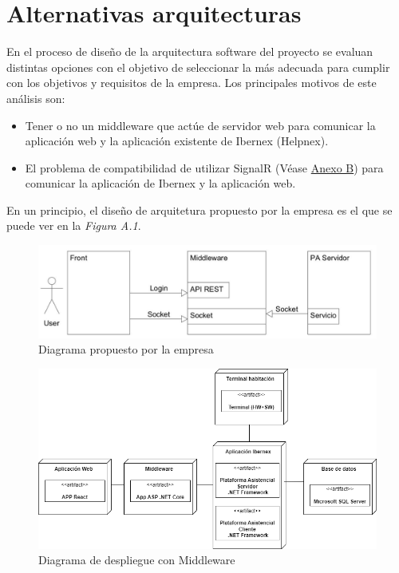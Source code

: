 \chapter{Alternativas arquitecturas}
\label{anexo-a}

En el proceso de diseño de la arquitectura software del proyecto se evaluan distintas opciones con el objetivo de seleccionar la más adecuada para cumplir con los objetivos y requisitos de la empresa. Los principales motivos de este análisis son:

\begin{itemize}
    \item Tener o no un middleware que actúe de servidor web para comunicar la aplicación web y la aplicación existente de Ibernex (Helpnex).
    \item El problema de compatibilidad de utilizar SignalR (Véase  \hyperref[anexo-b]{Anexo B}) para comunicar la aplicación de Ibernex y la aplicación web.
\end{itemize}

En un principio, el diseño de arquitetura propuesto por la empresa es el que se puede ver en la \textit{Figura A.1}. 

\begin{figure}[!h]
    \centering
    \includegraphics[width=15cm]{Imagenes/Descripcion-arquitectura}
    \caption{Diagrama propuesto por la empresa}
    \label{fig:descripcion-arquitectura}
\end{figure}

\begin{figure}[!h]
    \centering
    \includegraphics[width=15cm]{Imagenes/Arquitectura-despliegue-2}
    \caption{Diagrama de despliegue con Middleware}
    \label{fig:despliegue-2}
\end{figure}


